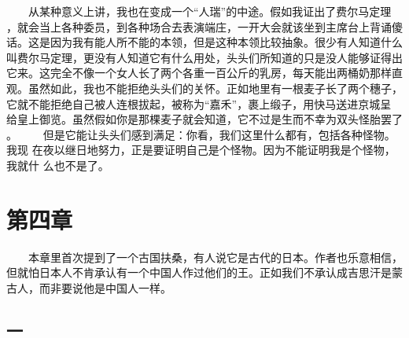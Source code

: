 　　从某种意义上讲，我也在变成一个“人瑞”的中途。假如我证出了费尔马定理 ，就会当上各种委员，到各种场合去表演端庄，一开大会就该坐到主席台上背诵傻 话。这是因为我有能人所不能的本领，但是这种本领比较抽象。很少有人知道什么 叫费尔马定理，更没有人知道它有什么用处，头头们所知道的只是没人能够证得出 它来。这完全不像一个女人长了两个各重一百公斤的乳房，每天能出两桶奶那样直 观。虽然如此，我也不能拒绝头头们的关怀。正如地里有一根麦子长了两个穗子， 它就不能拒绝自己被人连根拔起，被称为“嘉禾”，裹上缎子，用快马送进京城呈 给皇上御览。虽然假如你是那棵麦子就会知道，它不过是生而不幸为双头怪胎罢了 。 　　但是它能让头头们感到满足：你看，我们这里什么都有，包括各种怪物。我现 在夜以继日地努力，正是要证明自己是个怪物。因为不能证明我是个怪物，我就什 么也不是了。 
 
 
\section{第四章}
 
 　　本章里首次提到了一个古国扶桑，有人说它是古代的日本。作者也乐意相信， 但就怕日本人不肯承认有一个中国人作过他们的王。正如我们不承认成吉思汗是蒙 古人，而非要说他是中国人一样。 
 
 
\subsection{一} 
 
